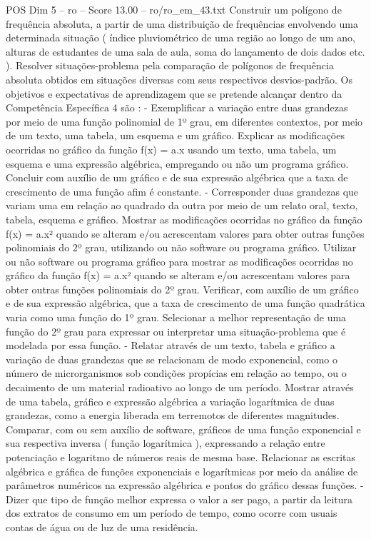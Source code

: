 \begin{textsample}{POS Dim 5 – ro – Score 13.00 – ro/ro\_em\_43.txt}
Construir um polígono de frequência absoluta, a partir de uma distribuição de frequências envolvendo uma determinada situação ( índice pluviométrico de uma região ao longo de um ano, alturas de estudantes de uma sala de aula, soma do lançamento de dois dados etc. ).
Resolver situações-problema pela comparação de polígonos de frequência absoluta obtidos em situações diversas com seus respectivos desvios-padrão.
Os objetivos e expectativas de aprendizagem que se pretende alcançar dentro da Competência Específica 4 são : - Exemplificar a variação entre duas grandezas por meio de uma função polinomial de 1º grau, em diferentes contextos, por meio de um texto, uma tabela, um esquema e um gráfico.
Explicar as modificações ocorridas no gráfico da função f(x) = a.x usando um texto, uma tabela, um esquema e uma expressão algébrica, empregando ou não um programa gráfico.
Concluir com auxílio de um gráfico e de sua expressão algébrica que a taxa de crescimento de uma função afim é constante. - Corresponder duas grandezas que variam uma em relação ao quadrado da outra por meio de um relato oral, texto, tabela, esquema e gráfico.
Mostrar as modificações ocorridas no gráfico da função f(x) = a.x² quando se alteram e/ou acrescentam valores para obter outras funções polinomiais do 2º grau, utilizando ou não software ou programa gráfico.
Utilizar ou não software ou programa gráfico para mostrar as modificações ocorridas no gráfico da função f(x) = a.x² quando se alteram e/ou acrescentam valores para obter outras funções polinomiais do 2º grau.
Verificar, com auxílio de um gráfico e de sua expressão algébrica, que a taxa de crescimento de uma função quadrática varia como uma função do 1º grau.
Selecionar a melhor representação de uma função do 2º grau para expressar ou interpretar uma situação-problema que é modelada por essa função. - Relatar através de um texto, tabela e gráfico a variação de duas grandezas que se relacionam de modo exponencial, como o número de microrganismos sob condições propícias em relação ao tempo, ou o decaimento de um material radioativo ao longo de um período.
Mostrar através de uma tabela, gráfico e expressão algébrica a variação logarítmica de duas grandezas, como a energia liberada em terremotos de diferentes magnitudes.
Comparar, com ou sem auxílio de software, gráficos de uma função exponencial e sua respectiva inversa ( função logarítmica ), expressando a relação entre potenciação e logaritmo de números reais de mesma base.
Relacionar as escritas algébrica e gráfica de funções exponenciais e logarítmicas por meio da análise de parâmetros numéricos na expressão algébrica e pontos do gráfico dessas funções. - Dizer que tipo de função melhor expressa o valor a ser pago, a partir da leitura dos extratos de consumo em um período de tempo, como ocorre com usuais contas de água ou de luz de uma residência.

\end{textsample}
